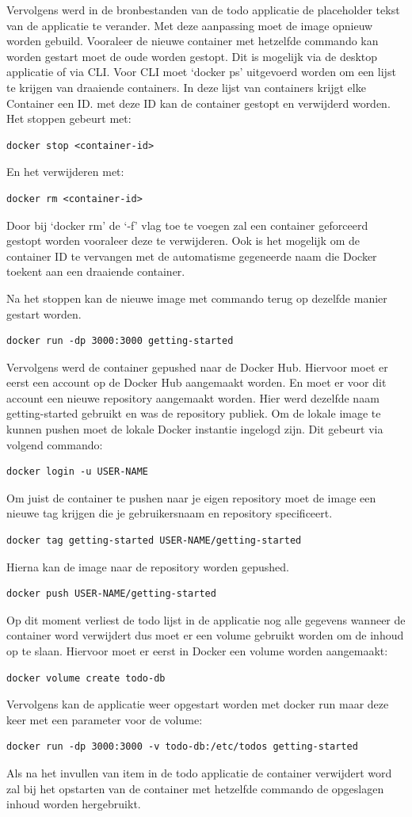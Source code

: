 Vervolgens werd in de bronbestanden van de todo applicatie de placeholder tekst van de applicatie te verander. Met deze aanpassing moet de image opnieuw worden gebuild. Vooraleer de nieuwe container met hetzelfde commando kan worden gestart moet de oude worden gestopt. Dit is mogelijk via de desktop applicatie of via CLI. Voor CLI moet ‘docker ps’ uitgevoerd worden om een lijst te krijgen van draaiende containers. In deze lijst van containers krijgt elke Container een ID. met deze ID kan de container gestopt en verwijderd worden.
Het stoppen gebeurt met:
\begin{verbatim}
docker stop <container-id>
\end{verbatim}
En het verwijderen met:
\begin{verbatim}
docker rm <container-id>
\end{verbatim}
Door bij ‘docker rm’ de ‘-f’ vlag toe te voegen zal een container geforceerd gestopt worden vooraleer deze te verwijderen. Ook is het mogelijk om de container ID te vervangen met  de automatisme gegeneerde naam die Docker toekent aan een draaiende container.

Na het stoppen kan de nieuwe image met commando terug op dezelfde manier gestart worden.
\begin{verbatim}
docker run -dp 3000:3000 getting-started
\end{verbatim}
Vervolgens werd de container gepushed naar de Docker Hub. Hiervoor moet er eerst een account op de Docker Hub aangemaakt worden. En moet er voor dit account een nieuwe repository aangemaakt worden. Hier werd dezelfde naam getting-started gebruikt en was de repository publiek. Om de lokale image te kunnen pushen moet de lokale Docker instantie ingelogd zijn. Dit gebeurt via volgend commando:
\begin{verbatim}
docker login -u USER-NAME
\end{verbatim}
Om juist de container te pushen naar je eigen repository moet de image een nieuwe tag krijgen die je gebruikersnaam en repository specificeert.
\begin{verbatim}
docker tag getting-started USER-NAME/getting-started
\end{verbatim}
Hierna kan de image naar de repository worden gepushed.
\begin{verbatim}
docker push USER-NAME/getting-started
\end{verbatim}
Op dit moment verliest de todo lijst in de applicatie nog alle gegevens wanneer de container word verwijdert dus moet er een volume gebruikt worden om de inhoud op te slaan. Hiervoor moet er eerst in Docker een volume worden aangemaakt:
\begin{verbatim}
docker volume create todo-db
\end{verbatim}
Vervolgens kan de applicatie weer opgestart worden met docker run maar deze keer met een parameter voor de volume:
\begin{verbatim}
docker run -dp 3000:3000 -v todo-db:/etc/todos getting-started
\end{verbatim}
Als na het invullen van item in de todo applicatie de container verwijdert word zal bij het opstarten van de container met hetzelfde commando de opgeslagen inhoud worden hergebruikt.

